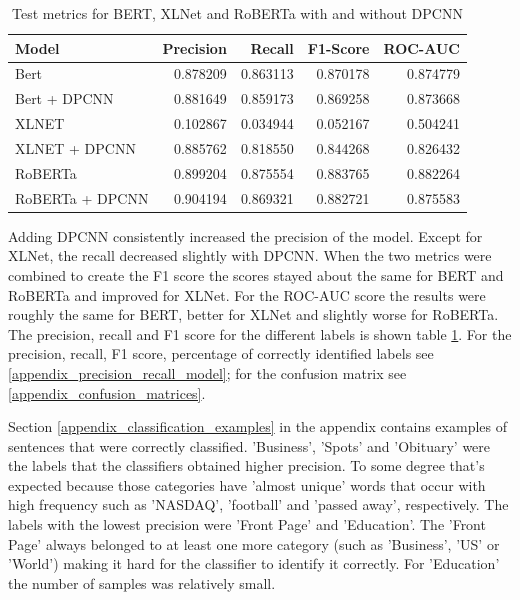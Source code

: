 \documentclass{article}
\begin{document}
\begin{table}
\centering
\begin{tabular}{lrrrr}
\toprule
           Model &  Precision &    Recall &  F1-Score &   ROC-AUC \\
\midrule
            Bert &   0.878209 &  0.863113 &  0.870178 &  0.874779 \\
    Bert + DPCNN &   0.881649 &  0.859173 &  0.869258 &  0.873668 \\
           XLNET &   0.102867 &  0.034944 &  0.052167 &  0.504241 \\
   XLNET + DPCNN &   0.885762 &  0.818550 &  0.844268 &  0.826432 \\
         RoBERTa &   0.899204 &  0.875554 &  0.883765 &  0.882264 \\
 RoBERTa + DPCNN &   0.904194 &  0.869321 &  0.882721 &  0.875583 \\
\bottomrule
\end{tabular}
\caption{Test metrics for BERT, XLNet and RoBERTa with and without DPCNN}
\label{table:test_metrics}
\end{table}

Adding DPCNN consistently increased the precision of the model. Except for XLNet, the recall decreased slightly with DPCNN. When the two metrics were combined to create the F1 score the scores stayed about the same for BERT and RoBERTa and improved for XLNet. For the ROC-AUC score the results were roughly the same for BERT, better for XLNet and slightly worse for RoBERTa. The precision, recall and F1 score for the different labels is shown table \ref{table:test_metrics}. For the precision, recall, F1 score, percentage of correctly identified labels see \ref{appendix_precision_recall_model}; for the confusion matrix see \ref{appendix_confusion_matrices}.

Section \ref{appendix_classification_examples} in the appendix contains examples of sentences that were correctly classified. 'Business', 'Spots' and 'Obituary' were the labels that the classifiers obtained higher precision. To some degree that's expected because those categories have 'almost unique' words that occur with high frequency such as 'NASDAQ', 'football' and 'passed away', respectively. The labels with the lowest precision were 'Front Page' and 'Education'. The 'Front Page' always belonged to at least one more category (such as 'Business', 'US' or 'World') making it hard for the classifier to identify it correctly. For 'Education' the number of samples was relatively small.
\end{document}
